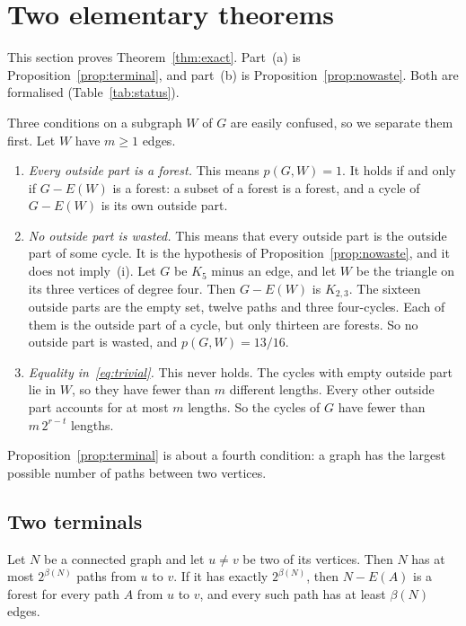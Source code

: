 \section{Two elementary theorems}\label{sec:exact}

This section proves Theorem~\ref{thm:exact}. Part~(a) is Proposition~\ref{prop:terminal}, and
part~(b) is Proposition~\ref{prop:nowaste}. Both are formalised (Table~\ref{tab:status}).

Three conditions on a subgraph $W$ of $G$ are easily confused, so we separate them first. Let $W$
have $m\ge1$ edges.
\begin{enumerate}
\item[\textup{(i)}] \emph{Every outside part is a forest.} This means $p(G,W)=1$. It holds if and
only if $G-E(W)$ is a forest: a subset of a forest is a forest, and a cycle of $G-E(W)$ is its own
outside part.
\item[\textup{(ii)}] \emph{No outside part is wasted.} This means that every outside part is the
outside part of some cycle. It is the hypothesis of Proposition~\ref{prop:nowaste}, and it does not
imply~(i). Let $G$ be $K_5$ minus an edge, and let $W$ be the triangle on its three vertices of
degree four. Then $G-E(W)$ is $K_{2,3}$. The sixteen outside parts are the empty set, twelve paths
and three four-cycles. Each of them is the outside part of a cycle, but only thirteen are forests.
So no outside part is wasted, and $p(G,W)=13/16$.
\item[\textup{(iii)}] \emph{Equality in~\eqref{eq:trivial}.} This never holds. The cycles with
empty outside part lie in $W$, so they have fewer than $m$ different lengths. Every other outside
part accounts for at most $m$ lengths. So the cycles of $G$ have fewer than $m\,2^{r-t}$ lengths.
\end{enumerate}
Proposition~\ref{prop:terminal} is about a fourth condition: a graph has the largest possible
number of paths between two vertices.

\subsection{Two terminals}

\begin{proposition}\label{prop:terminal}
Let $N$ be a connected graph and let $u\ne v$ be two of its vertices. Then $N$ has at most
$2^{\beta(N)}$ paths from $u$ to $v$. If it has exactly $2^{\beta(N)}$, then $N-E(A)$ is a forest
for every path $A$ from $u$ to $v$, and every such path has at least $\beta(N)$ edges.
\end{proposition}

